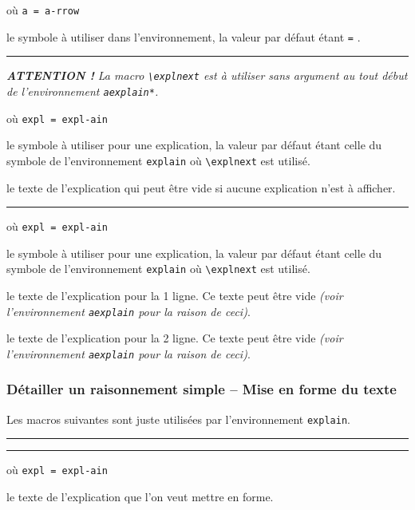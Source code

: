 \documentclass[12pt,a4paper]{article}
\newcommand\env[1]{\texttt{#1}}
\newcommand\macro[1]{\env{\textbackslash{}#1}}
\theoremstyle{definition}
\newcommand\separation{
	\medskip
	\hfill\rule{0.5\textwidth}{0.75pt}\hfill
	\medskip
}
\newcommand\extraspace{
	\vspace{0.25em}
}
\newcommand\mwhyprefix[2]{%
	\texttt{#1 = #1-#2}%
}
\begin{document}
  où \quad \mwhyprefix{a}{rrow}

\IDoption{} le symbole à utiliser dans l'environnement, la valeur par défaut étant \verb+=+ .


\separation


\emph{\textbf{ATTENTION !} La macro \macro{explnext} est à utiliser sans argument au tout début de l'environnement \env{aexplain*}.}

\extraspace

\extraspace

 où \quad \mwhyprefix{expl}{ain}

\IDoption{} le symbole à utiliser pour une explication, la valeur par défaut étant celle du symbole de l'environnement \env{explain} où \macro{explnext} est utilisé.

\IDarg{} le texte de l'explication qui peut être vide si aucune explication n'est à afficher.


\separation


 où \quad \mwhyprefix{expl}{ain}

\IDoption{} le symbole à utiliser pour une explication, la valeur par défaut étant celle du symbole de l'environnement \env{explain} où \macro{explnext} est utilisé.

 le texte de l'explication pour la 1\iere{} ligne.
          Ce texte peut être vide \emph{(voir l'environnement \env{aexplain} pour la raison de ceci)}.

 le texte de l'explication pour la 2\ieme{} ligne.
          Ce texte peut être vide \emph{(voir l'environnement \env{aexplain} pour la raison de ceci)}.




\subsubsection{Détailler un raisonnement simple -- Mise en forme du texte}

Les macros suivantes sont juste utilisées par l'environnement \env{explain}.


\separation




\separation


 où \quad \mwhyprefix{expl}{ain}

\IDarg{} le texte de l'explication que l'on veut mettre en forme.
\end{document}

